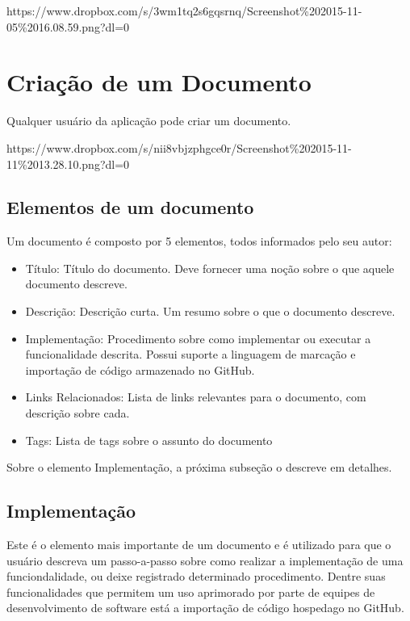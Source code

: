 https://www.dropbox.com/s/3wm1tq2s6gqsrnq/Screenshot\%202015-11-05\%2016.08.59.png?dl=0

\section{Criação de um Documento}

Qualquer usuário da aplicação pode criar um documento.

https://www.dropbox.com/s/nii8vbjzphgce0r/Screenshot\%202015-11-11\%2013.28.10.png?dl=0

\subsection{Elementos de um documento}

Um documento é composto por 5 elementos, todos informados pelo seu autor:

\begin{itemize}
  \item Título: Título do documento. Deve fornecer uma noção sobre o que aquele documento descreve.
  \item Descrição: Descrição curta. Um resumo sobre o que o documento descreve.
  \item Implementação: Procedimento sobre como implementar ou executar a funcionalidade descrita. Possui suporte a linguagem de marcação e importação de código armazenado no GitHub.
  \item Links Relacionados: Lista de links relevantes para o documento, com descrição sobre cada.
  \item Tags: Lista de tags sobre o assunto do documento
\end{itemize}

Sobre o elemento Implementação, a próxima subseção o descreve em detalhes.

\subsection{Implementação}

Este é o elemento mais importante de um documento e é utilizado para que o usuário descreva um passo-a-passo sobre
como realizar a implementação de uma funciondalidade, ou deixe registrado determinado procedimento. Dentre suas funcionalidades que permitem um uso aprimorado por parte de equipes de desenvolvimento de software está a importação de código hospedago no GitHub.

